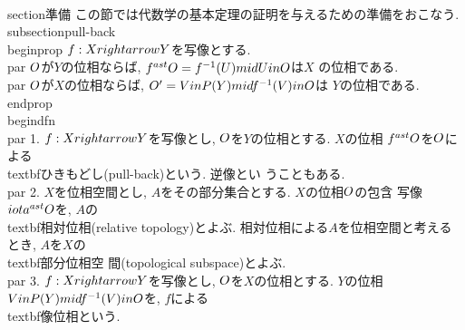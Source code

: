  \\section{準備}
 この節では代数学の基本定理の証明を与えるための準備をおこなう.
\\subsection{pull-back}
\\begin{prop}
 $f:X\\rightarrow Y$を写像とする.
 \\par $\\O$が$Y$の位相ならば, $f^{\\ast}\\O=\\{f^{-1}(U)\\mid U\\in \\O\\}$は$X$
 の位相である.
 \\par $\\O$が$X$の位相ならば, $\\O'=\\{V\\in P(Y)\\mid f^{-1}(V)\\in \\O\\}$は
 $Y$の位相である.
\\end{prop}
\\begin{dfn}
 {}
 \\par 1. $f:X\\rightarrow Y$を写像とし, $\\O$を$Y$の位相とする. $X$の位相
 $f^{\\ast}\\O$を$\\O$による\\textbf{ひきもどし}(pull-back)という. 逆像とい
 うこともある.
 \\par 2. $X$を位相空間とし, $A$をその部分集合とする. $X$の位相$\\O$の包含
 写像$\\iota^{\\ast}\\O$を, $A$の\\textbf{相対位相}(relative topology)とよぶ.
 相対位相による$A$を位相空間と考えるとき, $A$を$X$の\\textbf{部分位相空
 間}(topological subspace)とよぶ.
 \\par 3. $f:X\\rightarrow Y$を写像とし, $\\O$を$X$の位相とする. $Y$の位相
 $\\{V\\in P(Y)\\mid f^{-1}(V)\\in \\O\\}$を, $f$による\\textbf{像位相}という.
